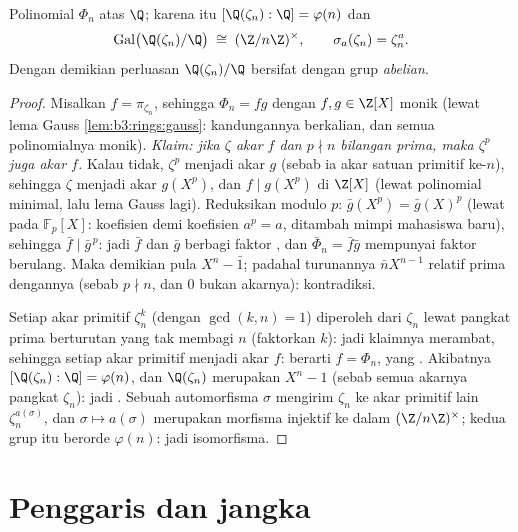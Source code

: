 \begin{theorem}\label{thm:b3:galois:cyclotomicirred}
Polinomial $\Phi_n$  atas $\Q$; karena itu $[\Q(\zeta_n) : \Q] =
\varphi(n)$ dan
\[
\operatorname{Gal}\bigl(\Q(\zeta_n)/\Q\bigr) \;\cong\;
(\Z/n\Z)^\times,
\qquad \sigma_a(\zeta_n) = \zeta_n^a .
\]
Dengan demikian perluasan $\Q(\zeta_n)/\Q$ bersifat  dengan grup
\emph{abelian}.
\end{theorem}

\begin{proof}
Misalkan $f = \pi_{\zeta_n}$, sehingga $\Phi_n = fg$ dengan $f, g \in \Z[X]$
monik (lewat lema Gauss \cref{lem:b3:rings:gauss}: kandungannya
berkalian, dan semua polinomialnya monik). \emph{Klaim: jika $\zeta$
akar $f$ dan $p \nmid n$ bilangan prima, maka $\zeta^p$ juga akar
$f$.} Kalau tidak, $\zeta^p$ menjadi akar $g$ (sebab ia akar satuan
primitif ke-$n$), sehingga $\zeta$ menjadi akar $g(X^p)$, dan $f
\mid g(X^p)$ di $\Z[X]$ (lewat polinomial minimal, lalu lema Gauss lagi).
Reduksikan modulo $p$: $\bar g(X^p) = \bar g(X)^p$ (lewat  pada
$\mathbb F_p[X]$: koefisien demi koefisien $a^p = a$, ditambah mimpi
mahasiswa baru), sehingga $\bar f \mid \bar g^{\,p}$: jadi $\bar f$ dan $\bar g$
berbagi faktor , dan $\bar\Phi_n = \bar f\bar g$ mempunyai
faktor berulang. Maka demikian pula $X^n - \bar 1$; padahal
turunannya $\bar nX^{n-1}$ relatif prima dengannya (sebab $p \nmid n$, dan
$0$ bukan akarnya): kontradiksi.

Setiap akar primitif $\zeta_n^k$ (dengan $\gcd(k, n) = 1$) diperoleh
dari $\zeta_n$ lewat pangkat prima berturutan yang tak membagi $n$
(faktorkan $k$): jadi klaimnya merambat, sehingga setiap akar primitif menjadi
akar $f$: berarti $f = \Phi_n$, yang . Akibatnya
$[\Q(\zeta_n):\Q] = \varphi(n)$, dan $\Q(\zeta_n)$ merupakan
  $X^n - 1$ (sebab semua akarnya pangkat
$\zeta_n$): jadi . Sebuah automorfisma $\sigma$ mengirim $\zeta_n$
ke akar primitif lain $\zeta_n^{a(\sigma)}$, dan $\sigma
\mapsto a(\sigma)$ merupakan morfisma injektif ke dalam
$(\Z/n\Z)^\times$; kedua grup itu berorde $\varphi(n)$: jadi
isomorfisma.
\end{proof}

\section{Penggaris dan jangka}

